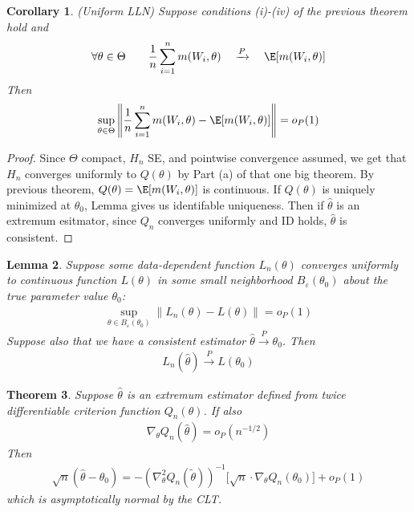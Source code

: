 \documentclass[12pt]{article}
\theoremstyle{plain}
\newtheorem{thm}{Theorem}[section]
\newtheorem{lem}[thm]{Lemma}
\newtheorem{cor}[thm]{Corollary}
\theoremstyle{definition}
\theoremstyle{remark}
\newcommand{\pto}{\xrightarrow{P}}
\newcommand{\sumin}{\sum^n_{i=1}}
\begin{document}
\begin{cor}\emph{(Uniform LLN)}
Suppose conditions (i)-(iv) of the previous theorem hold and
\begin{align*}
  \forall \theta\in\Theta
  \qquad
  \frac{1}{n}
  \sumin
  m(W_i,\theta)
  \quad\pto\quad
  \E[m(W_i,\theta)]
\end{align*}
Then
\begin{align}
  \sup_{\theta\in\Theta}
  \left\lVert
  \frac{1}{n}
  \sumin
  m(W_i,\theta)
  -
  \E[m(W_i,\theta)]
  \right\rVert =
  o_P(1)
\end{align}
\end{cor}
\begin{proof}
Since $\Theta$ compact, $H_n$ SE, and pointwise convergence assumed, we
get that $H_n$ converges uniformly to $Q(\theta)$ by Part (a) of that
one big theorem.
By previous theorem, $Q(\theta)=\E[m(W_i,\theta)]$ is continuous.
If $Q(\theta)$ is uniquely minimized at $\theta_0$, Lemma gives us
identifable uniqueness.
Then if $\hat{\theta}$ is an extremum esitmator, since $Q_n$ converges
uniformly and ID holds, $\hat{\theta}$ is consistent.
\end{proof}

\begin{lem}
Suppose some data-dependent function $L_n(\theta)$ converges uniformly
to continuous function $L(\theta)$ in some small neighborhood
$B_\varepsilon(\theta_0)$ about the true parameter value $\theta_0$:
\begin{align*}
  \sup_{\theta\in B_\varepsilon(\theta_0)}
  \lVert L_n(\theta) - L(\theta)\rVert
  = o_P(1)
\end{align*}
Suppose also that we have a consistent estimator
$\hat{\theta}\pto\theta_0$. Then
\begin{align*}
  L_n(\hat{\theta})
  \pto L(\theta_0)
\end{align*}
\end{lem}

\begin{thm}
Suppose $\hat{\theta}$ is an extremum estimator defined from twice
differentiable criterion function $Q_n(\theta)$.
If also
\begin{align*}
  \nabla_\theta
  Q_n(\hat{\theta})
  =
  o_P(n^{-1/2})
\end{align*}
Then
\begin{align*}
  \sqrt{n}(\hat{\theta}-\theta_0)
  =
  -(\nabla_{\theta}^2 Q_n(\tilde{\theta}))^{-1}
  \big[
  \sqrt{n}\cdot \nabla_{\theta} Q_n(\theta_0)
  \big]
  +
  o_P(1)
\end{align*}
which is asymptotically normal by the CLT.
\end{thm}
\end{document}
